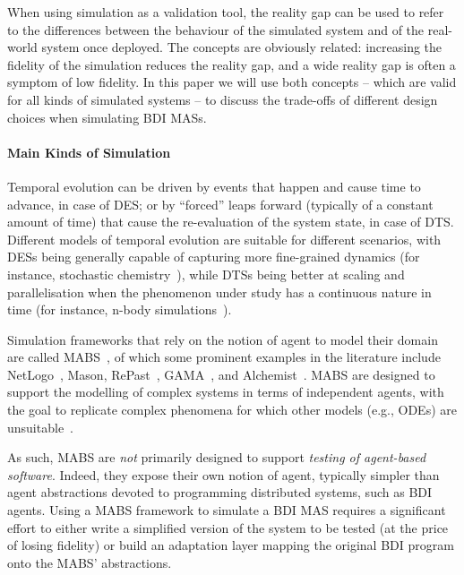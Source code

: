 When using simulation as a validation tool,
the reality gap can be used to refer to the differences between the behaviour of the simulated system
and of the real-world system once deployed.
%
The concepts are obviously related:
increasing the fidelity of the simulation reduces the reality gap,
and a wide reality gap is often a symptom of low fidelity.
%
In this paper we will use both concepts
-- which are valid for all kinds of simulated systems --
to discuss the trade-offs of different design choices
when simulating \ac{BDI} \acp{MAS}.

\paragraph{Main Kinds of Simulation}

Temporal evolution can be driven by events that happen and cause time to advance, in case of \acf{DES};
or by ``forced'' leaps forward (typically of a constant amount of time)
that cause the re-evaluation of the system state, in case of \acf{DTS}.
%
Different models of temporal evolution are suitable for different scenarios,
with \acp{DES} being generally capable of capturing more fine-grained dynamics
(for instance, stochastic chemistry~\cite{Cai2007}),
while \acp{DTS} being better at scaling and parallelisation when the phenomenon under study has a continuous nature in time
(for instance, n-body simulations~\cite{Richardson2000}).

Simulation frameworks that rely on the notion of agent to model their domain
are called \ac{MABS}~\cite{DrogoulVM02,BandiniMV09},
of which some prominent examples in the literature include
NetLogo~\cite{Sklar07},
 Mason\cite{LukeCPSB05},
 RePast~\cite{NorthCOTMBS13},
 GAMA~\cite{Taillandier2018},
 and Alchemist~\cite{PianiniJOS2013}.
%
\ac{MABS} are designed to support the modelling of complex systems in terms of independent agents,
with the goal to replicate complex phenomena for which other models
(e.g., \acp{ODE}) are unsuitable~\cite{DBLP:books/tf/09/DrogoulMF09,Edmonds00}.

As such,
\ac{MABS} are \emph{not} primarily designed to support \emph{testing of agent-based software}.
%
Indeed, they expose their own notion of agent,
typically simpler than agent abstractions devoted to programming distributed systems,
such as \ac{BDI} agents.
%
Using a \ac{MABS} framework to simulate a \ac{BDI} \ac{MAS} requires a significant effort
to either write a simplified version of the system to be tested
(at the price of losing fidelity)
or build an adaptation layer mapping the original \ac{BDI} program onto the \ac{MABS}' abstractions.



